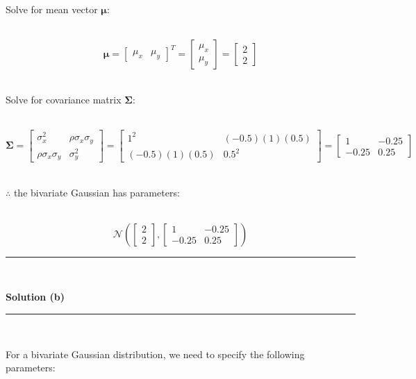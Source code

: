 \documentclass{article}
\begin{document}
\parbox{\textwidth}{Solve for mean vector $\boldsymbol{\mu}$:}\\

$$\boldsymbol{\mu} = \begin{bmatrix} \mu_x & \mu_y \end{bmatrix}^T = \begin{bmatrix}
    \mu_x \\
    \mu_y
\end{bmatrix} = \begin{bmatrix}
    2 \\
    2
\end{bmatrix}$$\\

\parbox{\textwidth}{Solve for covariance matrix $\boldsymbol{\Sigma}$:}\\

$$\boldsymbol{\Sigma} = \begin{bmatrix} \sigma_x^2 & \rho\sigma_x\sigma_y \\ \rho\sigma_x\sigma_y & \sigma_y^2 \end{bmatrix} = \begin{bmatrix} 1^2 & (-0.5)(1)(0.5) \\(-0.5)(1)(0.5) & 0.5^2\end{bmatrix} = \begin{bmatrix} 1 & -0.25 \\-0.25 & 0.25\end{bmatrix}$$\\

\parbox{\textwidth}{$\therefore$ the bivariate Gaussian has parameters:}\\

$$\mathcal{N}\left(\begin{bmatrix} 2 \\ 2 \end{bmatrix}, \begin{bmatrix} 
    1 & -0.25 \\
    -0.25 & 0.25
\end{bmatrix}\right)$$

\noindent\rule{\textwidth}{0.4pt}\\

\newpage

\parbox{\textwidth}{\textbf{Solution (b)}}

\noindent\rule{\textwidth}{0.4pt}\\

\parbox{\textwidth}{For a bivariate Gaussian distribution, we need to specify the following parameters:}\\
\end{document}
